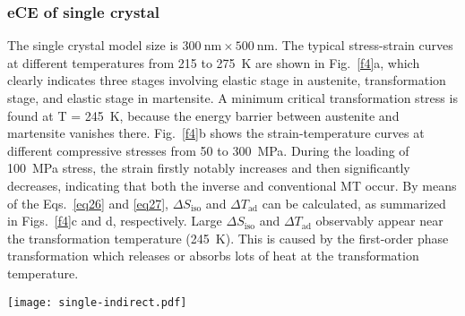 \documentclass[reprint,3p,sort&compress,times,onecolumn]{elsarticle}
\begin{document}
\subsubsection{eCE of single crystal}


The single crystal model size is $300~\text{nm} \times 500~\text{nm}$.
The typical stress-strain curves at different temperatures from 215 to 275~K are shown in Fig.~\ref{f4}a, which clearly indicates three stages involving elastic stage in austenite, transformation stage, and elastic stage in martensite. A minimum critical transformation stress is found at T = 245~K, because the energy barrier between austenite and martensite vanishes there.
Fig.~\ref{f4}b shows the strain-temperature curves at different compressive stresses from 50 to 300~MPa. During the loading of 100~MPa stress, the strain firstly notably increases and then significantly decreases, indicating that both the inverse and conventional MT occur. By means of the Eqs.~\ref{eq26} and \ref{eq27}, $\Delta S_{\text{iso}}$ and $\Delta T_{\text{ad}}$ can be calculated, as summarized in Figs.~\ref{f4}c and d, respectively. Large $\Delta S_{\text{iso}}$ and $\Delta T_{\text{ad}}$ observably appear near the transformation temperature (245~K). This is caused by the first-order phase transformation which releases or absorbs lots of heat at the transformation temperature.
 
\begin{figure*}[!t]
\centering
  \texttt{[image: single-indirect.pdf]}
  \caption{(a) Stress-strain responses of single crystal under 500 MPa compressive stress at various temperatures. (b) Strain-temperature curves under compressive stresses of 50, 100, 150, 200, 250, and 300~MPa. (c) $\Delta S_{\text{iso}}$ and (d) $\Delta T_{\text{ad}}$ calculated by Eq.~\ref{eq26} and \ref{eq27} at various temperatures.} \label{f4}
\end{figure*}
\end{document}
